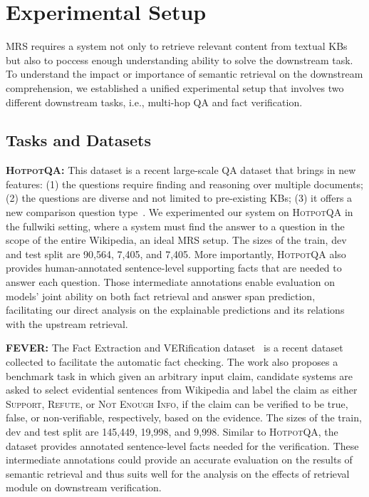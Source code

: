 \documentclass[11pt,a4paper]{article}
\newcommand\hpqa{\textsc{HotpotQA}\xspace}
\begin{document}
\section{Experimental Setup}
MRS requires a system not only to retrieve relevant content from textual KBs but also to poccess enough understanding ability to solve the downstream task. To understand the impact or importance of semantic retrieval on the downstream comprehension, we established a unified experimental setup that involves two different downstream tasks, i.e., multi-hop QA and fact verification.

\subsection{Tasks and Datasets}
\noindent\textbf{\hpqa:} This dataset is a recent large-scale QA dataset that brings in new features: (1) the questions require finding and reasoning over multiple documents; (2) the questions are diverse and not limited to pre-existing KBs; (3) it offers a new comparison question type~\cite{yang2018hotpotqa}. We experimented our system on \hpqa in the fullwiki setting, where a system must find the answer to a question in the scope of the entire Wikipedia, an ideal MRS setup. The sizes of the train, dev and test split are 90,564, 7,405, and 7,405.
More importantly, \hpqa also provides human-annotated sentence-level supporting facts that are needed to answer each question. Those intermediate annotations enable evaluation on models' joint ability on both fact retrieval and answer span prediction, facilitating our direct analysis on the explainable predictions and its relations with the upstream retrieval.

\noindent\textbf{FEVER:} The Fact Extraction and VERification dataset~\cite{Thorne18Fever} is a recent dataset collected to facilitate the automatic fact checking. The work also proposes a benchmark task in which given an arbitrary input claim, candidate systems are asked to select evidential sentences from Wikipedia and label the claim as either \textsc{Support}, \textsc{Refute}, or \textsc{Not Enough Info}, if the claim can be verified to be true, false, or non-verifiable, respectively, based on the evidence. The sizes of the train, dev and test split are 145,449, 19,998, and 9,998. Similar to \hpqa, the dataset provides annotated sentence-level facts needed for the verification. These intermediate annotations could provide an accurate evaluation on the results of semantic retrieval and thus suits well for the analysis on the effects of retrieval module on downstream verification.
\end{document}
